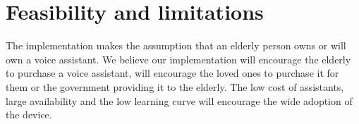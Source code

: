 \documentclass{article}
\begin{document}
\section*{Feasibility and limitations}

The implementation makes the assumption that an elderly person owns or will own a voice assistant. We believe our implementation will encourage the elderly to purchase a voice assistant, will encourage the loved ones to purchase it for them or the government providing it to the elderly. The low cost of assistants, large availability and the low learning curve will encourage the wide adoption of the device.
\end{document}

